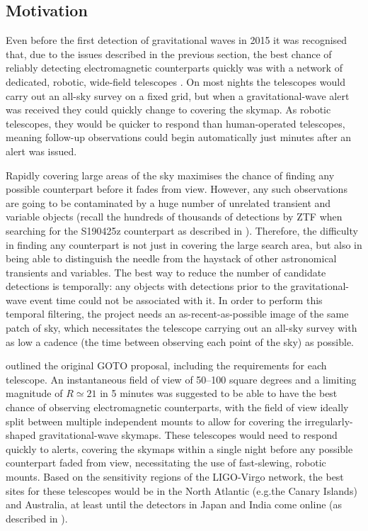 \subsection{Motivation}
\label{sec:goto_motivation}
\begin{colsection}

Even before the first detection of gravitational waves in 2015 it was recognised that, due to the issues described in the previous section, the best chance of reliably detecting electromagnetic counterparts quickly was with a network of dedicated, robotic, wide-field telescopes \citep{Darren}. On most nights the telescopes would carry out an all-sky survey on a fixed grid, but when a gravitational-wave alert was received they could quickly change to covering the skymap. As robotic telescopes, they would be quicker to respond than human-operated telescopes, meaning follow-up observations could begin automatically just minutes after an alert was issued.

Rapidly covering large areas of the sky maximises the chance of finding any possible counterpart before it fades from view. However, any such observations are going to be contaminated by a huge number of unrelated transient and variable objects (recall the hundreds of thousands of detections by ZTF when searching for the S190425z counterpart as described in ). Therefore, the difficulty in finding any counterpart is not just in covering the large search area, but also in being able to distinguish the needle from the haystack of other astronomical transients and variables. The best way to reduce the number of candidate detections is temporally: any objects with detections prior to the gravitational-wave event time could not be associated with it. In order to perform this temporal filtering, the project needs an as-recent-as-possible image of the same patch of sky, which necessitates the telescope carrying out an all-sky survey with as low a cadence (the time between observing each point of the sky) as possible.

\citet{Darren} outlined the original GOTO proposal, including the requirements for each telescope. An instantaneous field of view of 50--100 square degrees and a limiting magnitude of $R\simeq21$ in 5 minutes was suggested to be able to have the best chance of observing electromagnetic counterparts, with the field of view ideally split between multiple independent mounts to allow for covering the irregularly-shaped gravitational-wave skymaps. These telescopes would need to respond quickly to alerts, covering the skymaps within a single night before any possible counterpart faded from view, necessitating the use of fast-slewing, robotic mounts. Based on the sensitivity regions of the LIGO-Virgo network, the best sites for these telescopes would be in the North Atlantic (e.g.\@ the Canary Islands) and Australia, at least until the detectors in Japan and India come online (as described in ).


\end{colsection}
